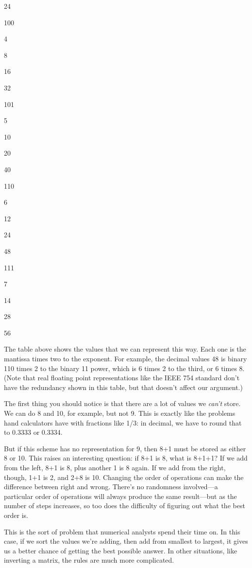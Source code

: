 \documentclass{book}
\begin{document}
24

100

4

8

16

32

101

5

10

20

40

110

6

12

24

48

111

7

14

28

56

The table above shows the values that we can represent this way. Each
one is the mantissa times two to the exponent. For example, the decimal
values 48 is binary 110 times 2 to the binary 11 power, which is 6 times
2 to the third, or 6 times 8. (Note that real floating point
representations like the IEEE 754 standard don't have the redundancy
shown in this table, but that doesn't affect our argument.)

The first thing you should notice is that there are a lot of values we
\emph{can't} store. We can do 8 and 10, for example, but not 9. This is
exactly like the problems hand calculators have with fractions like 1/3:
in decimal, we have to round that to 0.3333 or 0.3334.

But if this scheme has no representation for 9, then 8+1 must be stored
as either 8 or 10. This raises an interesting question: if 8+1 is 8,
what is 8+1+1? If we add from the left, 8+1 is 8, plus another 1 is 8
again. If we add from the right, though, 1+1 is 2, and 2+8 is 10.
Changing the order of operations can make the difference between right
and wrong. There's no randomness involved---a particular order of
operations will always produce the same result---but as the number of
steps increases, so too does the difficulty of figuring out what the
best order is.

This is the sort of problem that numerical analysts spend their time on.
In this case, if we sort the values we're adding, then add from smallest
to largest, it gives us a better chance of getting the best possible
answer. In other situations, like inverting a matrix, the rules are much
more complicated.
\end{document}
